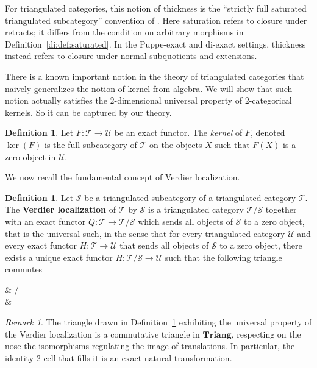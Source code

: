 \documentclass[11pt,reqno,a4paper]{amsart}
\theoremstyle{definition}
\newtheorem{definition}[theorem]{Definition}
\theoremstyle{remark}
\newtheorem{remark}[theorem]{Remark}
\def\nameit#1{\textrm{#1}~}
\def\defx{\nameit{Definition}}
\def\dfn#1{{\itshape #1}}
\newcommand{\T}{\mathcal{T}}
\renewcommand{\S}{\mathcal{S}}
\newcommand{\U}{\mathcal{U}}
\newcommand{\0}{\mathbf{0}}
\renewcommand{\1}{\mathbf{1}}
\newcommand{\Triang}{\mathbf{Triang}}
\def\:{\colon}
\begin{document}
For triangulated categories, this notion of thickness is the
``strictly full saturated triangulated subcategory'' convention
of \cite{StacksTri}. Here saturation refers to closure under
retracts; it differs from the condition on arbitrary morphisms
in Definition~\ref{di:def:saturated}. In the Puppe-exact and
di-exact settings, thickness instead refers to closure under
normal subquotients and extensions.

There is a known important notion in the theory of triangulated categories that naively generalizes the notion of kernel from algebra. We will show that such notion actually satisfies the 2-dimensional universal property of 2-categorical kernels. So it can be captured by our theory.

\begin{definition}\label{defker}
    Let $F\:\T \to \U$ be an exact functor. The \dfn{kernel} of $F$, denoted $\ker(F)$ is the full subcategory of $\T$ on the objects $X$ such that $F(X)$ is a zero object in $\U$.
\end{definition}

We now recall the fundamental concept of Verdier localization.

\begin{definition}\label{defVerdloc}
    Let $\S$ be a triangulated subcategory of a triangulated category $\T$. The \textbf{Verdier localization} of $\T$ by $\S$ is a triangulated category $\T/\S$ together with an exact functor $Q\:\T \to \T / \S$ which sends all objects of $\S$ to a zero object, that is the universal such, in the sense that for every triangulated category $\U$ and every exact functor $H\:\T \to \U$ that sends all objects of $\S$ to a zero object, there exists a unique exact functor $\overline{H}\: \T / \S \to \U$ such that the following triangle commutes
    \begin{cd}[4]
        \T \& {\T/\S} \\
	\& \U
	\arrow["Q", from=1-1, to=1-2]
	\arrow["H"', from=1-1, to=2-2]
	\arrow["{\overline{H}}", dashed, from=1-2, to=2-2]
    \end{cd}
\end{definition}

\begin{remark}\label{remtriangleinTriang}
    The triangle drawn in \defx\ref{defVerdloc} exhibiting the universal property of the Verdier localization is a commutative triangle in $\Triang$, respecting on the nose the isomorphisms regulating the image of translations. In particular, the identity 2-cell that fills it is an exact natural transformation.
\end{remark}
\end{document}
